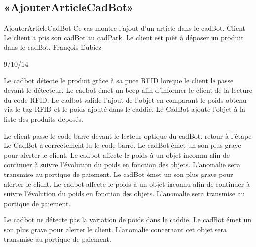 \subsection{«AjouterArticleCadBot»}

\startCU
\nom AjouterArticleCadBot
\but Ce cas montre l'ajout d'un article dans le cadBot.
\acteur Client
\precondition Le client a pris son cadBot au cadPark.
\declenchement Le client est prêt à déposer un produit dans le cadBot.
\auteur François Dubiez
\date 29/10/14

\nominal %
\startnominal
\etape[AAC:SA1] Le cadbot détecte le produit grâce à sa puce RFID lorsque le client le passe devant le détecteur. 
 Le cadbot émet un beep afin d'informer le client de la lecture du code RFID.
\etape[AAC:SE1] Le cadbot valide l'ajout de l'objet en comparant le poids obtenu via le tag RFID et  le poids ajouté dans le caddie.
\stopnominal
\postcondition Le CadBot ajoute l'objet à la liste des produits deposés.

\alternatifs %
\startalternatif[AAC:SA1] %
  \etape[AAC:SE1] Le client passe le code barre devant le lecteur optique du cadBot.
  \etape retour à l'étape 
\stopcondition
\postcondition Le CadBot a correctement lu le code barre.
   \etape Le cadBot émet un son plus grave pour alerter le client.
   \etape Le cadbot affecte le poids à un objet inconnu afin de continuer à suivre l'évolution du poids en fonction des objets.
\stopcondition
\postcondition L'anomalie sera transmise au portique de paiement.
   \etape Le cadBot émet un son plus grave pour alerter le client.
   \etape Le cadbot affecte le poids à un objet inconnu afin de continuer à suivre l'évolution du poids en fonction des objets.
\stopcondition
\postcondition L'anomalie sera transmise au portique de paiement.
\stopalternatif

\startalternatif[AAC:SE1]
   \etape Le cadbot ne détecte pas la variation de poids dans le caddie.
   \etape Le cadBot émet un son plus grave pour alerter le client.
\stopcondition
\postcondition L'anomalie concernant cet objet sera transmise au portique de paiement.
\stopalternatif

\stopCU

